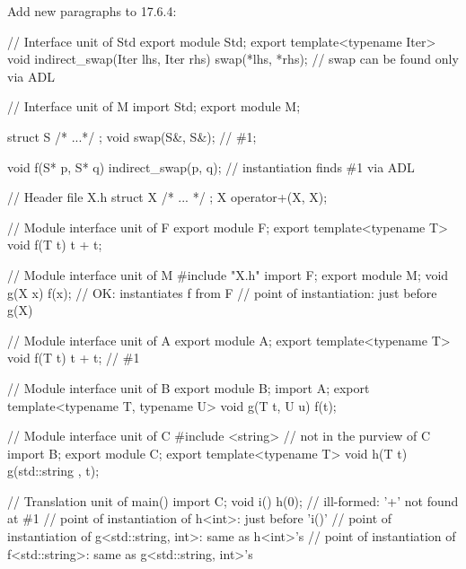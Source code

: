 \noindent
Add new paragraphs to 17.6.4:
\begin{std.txt}
   \color{addclr}
   \resetalinea[1]
   \alinea
   \enterexample
   \begin{codeblock}
     // Interface unit of Std
     export module Std;
     export template<typename Iter>
     void indirect_swap(Iter lhs, Iter rhs)
     {
        swap(*lhs, *rhs);    // swap can be found only via ADL
     }

     // Interface unit of M
     import Std;
     export module M;

     struct S { /* ...*/ };
     void swap(S&, S&);     // \#1;

     void f(S* p, S* q)
     {
        indirect_swap(p, q);   // instantiation finds \#1 via ADL
     }
   \end{codeblock}
   \exitexample
     
   \alinea
   \enterexample
   \begin{codeblock}
      // Header file X.h
      struct X { /* ... */ };
      X operator+(X, X);

      // Module interface unit of F
      export module F;
      export template<typename T>
      void f(T t) {
          t + t;
      }

      // Module interface unit of M
      #include "X.h"
      import F;
      export module M;
      void g(X x) {
         f(x);          // OK: instantiates f from F
                        // point of instantiation: just before g(X)
      }
   \end{codeblock}
   \exitexample

   \alinea
   \enternote
   \enterexample
   \begin{codeblock}
      // Module interface unit of A
      export module A;
      export template<typename T>
      void f(T t) {
         t + t;         // \#1
      }

      // Module interface unit of B
      export module B;
      import A;
      export template<typename T, typename U>
      void g(T t, U u) {
         f(t);
      }

      // Module interface unit of C
      #include <string>        // not in the purview of C
      import B;
      export module C;
      export template<typename T>
      void h(T t) {
         g(std::string{ }, t);
      }

      // Translation unit of main()
      import C;
      void i() {
         h(0);        // ill-formed: '+' not found at \#1
                      // point of instantiation of h<int>: just before 'i()'
                      // point of instantiation of g<std::string, int>: same as h<int>'s
                      // point of instantiation of f<std::string>: same as g<std::string, int>'s
      }
   \end{codeblock}
   \exitexample


\end{std.txt}
